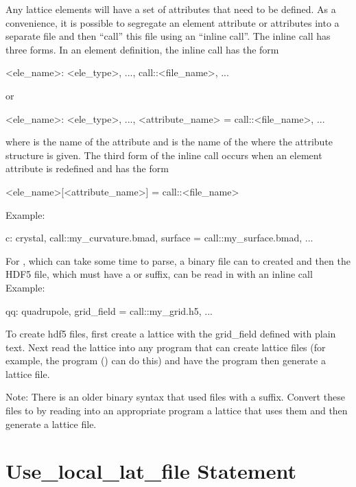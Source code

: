 {{{Any lattice elements will have a set of attributes that need to be defined.
As a convenience, it is possible to segregate an element attribute or attributes
into a separate file and then ``call'' this file using an
``inline call''. The inline call has three forms. In an element definition,
the inline call has the form
\begin{example}
  <ele_name>: <ele_type>, ..., call::<file_name>, ...
\end{example}
or
\begin{example}
  <ele_name>: <ele_type>, ..., <attribute_name> = call::<file_name>, ...
\end{example}
where  is the name of the attribute and
 is the name of the where the attribute structure is
given.  The third form of the inline call occurs when an element
attribute is redefined and has the form
\begin{example}
  <ele_name>[<attribute_name>] = call::<file_name>
\end{example}
Example:
\begin{example}
  c: crystal, call::my_curvature.bmad, surface = call::my_surface.bmad, ...
\end{example}  

For , which can take some time to parse, a  binary file can to created and then
the HDF5 file, which must have a  or  suffix, can be read in with an inline call Example:
\begin{example}
  qq: quadrupole, grid_field = call::my_grid.h5, ...
\end{example}
To create hdf5 files, first create a lattice with the grid_field defined with plain text. Next read
the lattice into any program that can create \bmad lattice files (for example, the \tao program
() can do this) and have the program then generate a lattice file.

Note: There is an older binary syntax that used files with a  suffix. Convert these files
to  by reading into an appropriate program a lattice that uses them and then generate a
lattice file.

\section{Use_local_lat_file Statement}
\label{s:use.loc}

}}}
